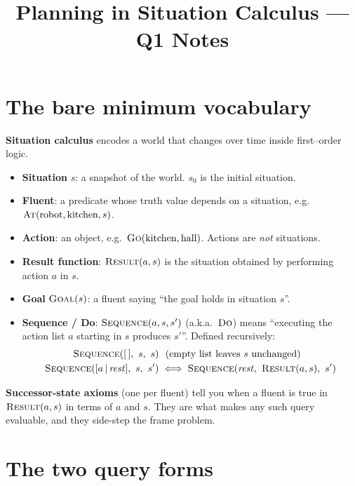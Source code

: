 \documentclass[11pt,a4paper]{article}
\title{\vspace{-1.5cm}Planning in Situation Calculus --- Q1 Notes}
\author{}
\date{}
\newcommand{\pred}[1]{\textsc{#1}}
\begin{document}
\maketitle
\vspace{-1cm}

\section*{The bare minimum vocabulary}

\textbf{Situation calculus} encodes a world that changes over time inside first--order logic.

\begin{itemize}[leftmargin=*,itemsep=2pt]
  \item \textbf{Situation} $s$: a snapshot of the world. $s_0$ is the initial situation.
  \item \textbf{Fluent}: a predicate whose truth value depends on a situation, e.g.\ $\pred{At}(\text{robot}, \text{kitchen}, s)$.
  \item \textbf{Action}: an object, e.g.\ $\pred{Go}(\text{kitchen},\text{hall})$. Actions are \emph{not} situations.
  \item \textbf{Result function}: $\pred{Result}(a, s)$ is the situation obtained by performing action $a$ in $s$.
  \item \textbf{Goal} $\pred{Goal}(s)$: a fluent saying ``the goal holds in situation $s$''.
  \item \textbf{Sequence / Do}: $\pred{Sequence}(a, s, s')$ (a.k.a.\ $\pred{Do}$) means ``executing the action list $a$ starting in $s$ produces $s'$''. Defined recursively:
  \begin{align*}
    \pred{Sequence}([\,],\ s,\ s) &\ \ \text{(empty list leaves $s$ unchanged)}\\
    \pred{Sequence}([a\,|\,\mathit{rest}],\ s,\ s') &\iff \pred{Sequence}(\mathit{rest},\ \pred{Result}(a,s),\ s')
  \end{align*}
\end{itemize}

\textbf{Successor-state axioms} (one per fluent) tell you when a fluent is true in $\pred{Result}(a,s)$ in terms of $a$ and $s$. They are what makes any such query evaluable, and they side-step the frame problem.

\section*{The two query forms}
\end{document}
